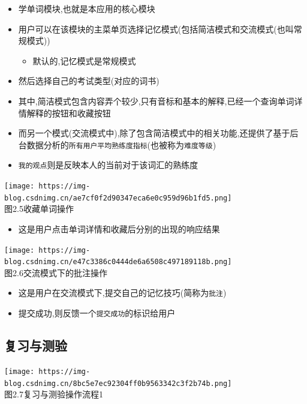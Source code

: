 \documentclass[
]{article}
\begin{document}
\begin{itemize}
\item
  学单词模块,也就是本应用的核心模块
\item
  用户可以在该模块的主菜单页选择记忆模式(包括简洁模式和交流模式(也叫常规模式))

  \begin{itemize}
  \item
    默认的,记忆模式是常规模式
  \end{itemize}
\item
  然后选择自己的考试类型(对应的词书)
\item
  其中,简洁模式包含内容弄个较少,只有音标和基本的解释,已经一个查询单词详情解释的按钮和收藏按钮
\item
  而另一个模式(交流模式中),除了包含简洁模式中的相关功能,还提供了基于后台数据分析的\texttt{所有用户平均熟练度指标}(也被称为\texttt{难度等级})
\item
  \texttt{我的观点}则是反映本人的当前对于该词汇的熟练度
\end{itemize}

\texttt{[image: https://img-blog.csdnimg.cn/ae7cf0f2d90347eca6e0c959d96b1fd5.png]}\\
图2.5收藏单词操作

\begin{itemize}
\item
  这是用户点击单词详情和收藏后分别的出现的响应结果
\end{itemize}

\texttt{[image: https://img-blog.csdnimg.cn/e47c3386c0444de6a6508c497189118b.png]}\\
图2.6交流模式下的批注操作

\begin{itemize}
\item
  这是用户在交流模式下,提交自己的记忆技巧(简称为\texttt{批注})
\item
  提交成功,则反馈一个\texttt{提交成功}的标识给用户
\end{itemize}

\hypertarget{ux590dux4e60ux4e0eux6d4bux9a8c}{%
\subsection{复习与测验}\label{ux590dux4e60ux4e0eux6d4bux9a8c}}

\texttt{[image: https://img-blog.csdnimg.cn/8bc5e7ec92304ff0b9563342c3f2b74b.png]}\\
图2.7复习与测验操作流程1
\end{document}
